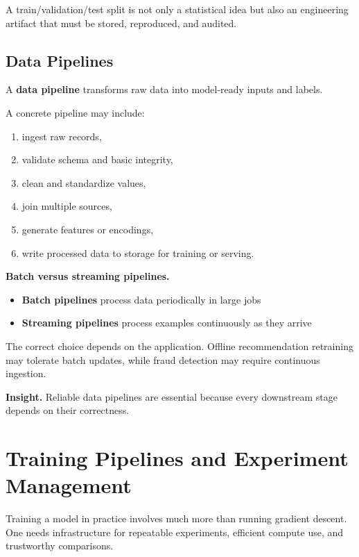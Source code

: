 \medskip

\noindent
A train/validation/test split is not only a statistical idea but also an engineering artifact that must be stored, reproduced, and audited.

\subsection{Data Pipelines}

A \textbf{data pipeline} transforms raw data into model-ready inputs and labels.

\medskip

\noindent
A concrete pipeline may include:
\begin{enumerate}
    \item ingest raw records,
    \item validate schema and basic integrity,
    \item clean and standardize values,
    \item join multiple sources,
    \item generate features or encodings,
    \item write processed data to storage for training or serving.
\end{enumerate}

\medskip

\noindent
\textbf{Batch versus streaming pipelines.}
\begin{itemize}
    \item \textbf{Batch pipelines} process data periodically in large jobs
    \item \textbf{Streaming pipelines} process examples continuously as they arrive
\end{itemize}

\medskip

\noindent
The correct choice depends on the application. Offline recommendation retraining may tolerate batch updates, while fraud detection may require continuous ingestion.

\medskip

\noindent
\textbf{Insight.}
Reliable data pipelines are essential because every downstream stage depends on their correctness.

\section{Training Pipelines and Experiment Management}

Training a model in practice involves much more than running gradient descent. One needs infrastructure for repeatable experiments, efficient compute use, and trustworthy comparisons.

